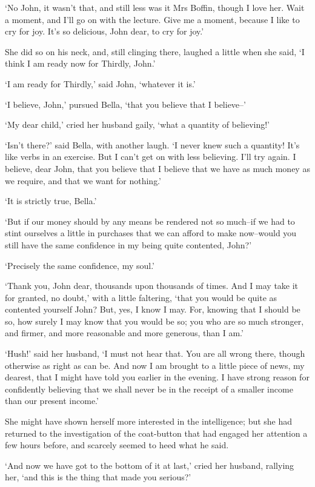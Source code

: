 ‘No John, it wasn’t that, and still less was it Mrs Boffin, though I
love her. Wait a moment, and I’ll go on with the lecture. Give me a
moment, because I like to cry for joy. It’s so delicious, John dear, to
cry for joy.’

She did so on his neck, and, still clinging there, laughed a little when
she said, ‘I think I am ready now for Thirdly, John.’

‘I am ready for Thirdly,’ said John, ‘whatever it is.’

‘I believe, John,’ pursued Bella, ‘that you believe that I believe--’

‘My dear child,’ cried her husband gaily, ‘what a quantity of
believing!’

‘Isn’t there?’ said Bella, with another laugh. ‘I never knew such a
quantity! It’s like verbs in an exercise. But I can’t get on with less
believing. I’ll try again. I believe, dear John, that you believe that
I believe that we have as much money as we require, and that we want for
nothing.’

‘It is strictly true, Bella.’

‘But if our money should by any means be rendered not so much--if we
had to stint ourselves a little in purchases that we can afford to
make now--would you still have the same confidence in my being quite
contented, John?’

‘Precisely the same confidence, my soul.’

‘Thank you, John dear, thousands upon thousands of times. And I may take
it for granted, no doubt,’ with a little faltering, ‘that you would be
quite as contented yourself John? But, yes, I know I may. For, knowing
that I should be so, how surely I may know that you would be so; you who
are so much stronger, and firmer, and more reasonable and more generous,
than I am.’

‘Hush!’ said her husband, ‘I must not hear that. You are all wrong
there, though otherwise as right as can be. And now I am brought to a
little piece of news, my dearest, that I might have told you earlier
in the evening. I have strong reason for confidently believing that
we shall never be in the receipt of a smaller income than our present
income.’

She might have shown herself more interested in the intelligence;
but she had returned to the investigation of the coat-button that had
engaged her attention a few hours before, and scarcely seemed to heed
what he said.

‘And now we have got to the bottom of it at last,’ cried her husband,
rallying her, ‘and this is the thing that made you serious?’

